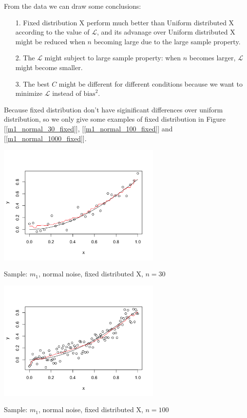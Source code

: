 \documentclass[twoside]{article}
\begin{document}
From the data we can draw some conclusions:

\begin{itemize}
  \item[1.] Fixed distribution X perform much better than Uniform distributed X according to the value of $\mathcal{L}$, and its advanage over Uniform distributed X might be reduced when $n$ becoming large due to the large sample property.
  \item[2.] The $\mathcal{L}$ might subject to large sample property: when $n$ becomes larger, $\mathcal{L}$ might become smaller.
  \item[3.] The best $C$ might be different for different conditions because we want to minimize $\mathcal{L}$ instead of $\mathrm{bias}^2$.
\end{itemize}

Because fixed distribution don't have siginificant differences over uniform distribution, so we only give some examples of fixed distribution in Figure [\ref{m1_normal_30_fixed}], [\ref{m1_normal_100_fixed}] and [\ref{m1_normal_1000_fixed}].

\begin{center}
\makeatletter
\def\@captype{figure}
\makeatother
\includegraphics [height=6cm]{code/m1_normal_30_fixed.png}
\caption{Sample: $m_1$, normal noise, fixed distributed X, $n=30$}
\label{m1_normal_30_fixed}
\end{center}

\begin{center}
\makeatletter
\def\@captype{figure}
\makeatother
\includegraphics [height=6cm]{code/m1_normal_100_fixed.png}
\caption{Sample: $m_1$, normal noise, fixed distributed X, $n=100$}
\label{m1_normal_100_fixed}
\end{center}
\end{document}
